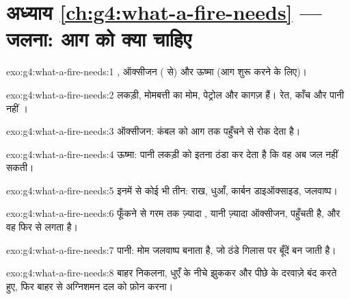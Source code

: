 \section*{अध्याय \ref{ch:g4:what-a-fire-needs} --- जलना: आग को क्या चाहिए}

\begin{solution}{exo:g4:what-a-fire-needs:1}
, ऑक्सीजन ( से) और ऊष्मा (आग शुरू करने के लिए)।
\end{solution}

\begin{solution}{exo:g4:what-a-fire-needs:2}
लकड़ी, मोमबत्ती का मोम, पेट्रोल और कागज़  हैं। रेत, काँच और पानी
नहीं ।
\end{solution}

\begin{solution}{exo:g4:what-a-fire-needs:3}
ऑक्सीजन: कंबल  को आग तक पहुँचने से रोक देता है।
\end{solution}

\begin{solution}{exo:g4:what-a-fire-needs:4}
ऊष्मा: पानी  लकड़ी को इतना ठंडा कर देता है कि वह अब
जल नहीं सकती।
\end{solution}

\begin{solution}{exo:g4:what-a-fire-needs:5}
इनमें से कोई भी तीन: राख, धुआँ, कार्बन डाइऑक्साइड, जलवाष्प।
\end{solution}

\begin{solution}{exo:g4:what-a-fire-needs:6}
फूँकने से गरम  तक ज़्यादा , यानी ज़्यादा ऑक्सीजन, पहुँचती है, और
वह फिर से  लगता है।
\end{solution}

\begin{solution}{exo:g4:what-a-fire-needs:7}
पानी:  मोम जलवाष्प बनाता है, जो ठंडे गिलास पर बूँदें
बन जाती है।
\end{solution}

\begin{solution}{exo:g4:what-a-fire-needs:8}
बाहर निकलना, धुएँ के नीचे झुककर और पीछे के दरवाज़े बंद करते हुए,
फिर बाहर से अग्निशमन दल को फ़ोन करना।
\end{solution}

